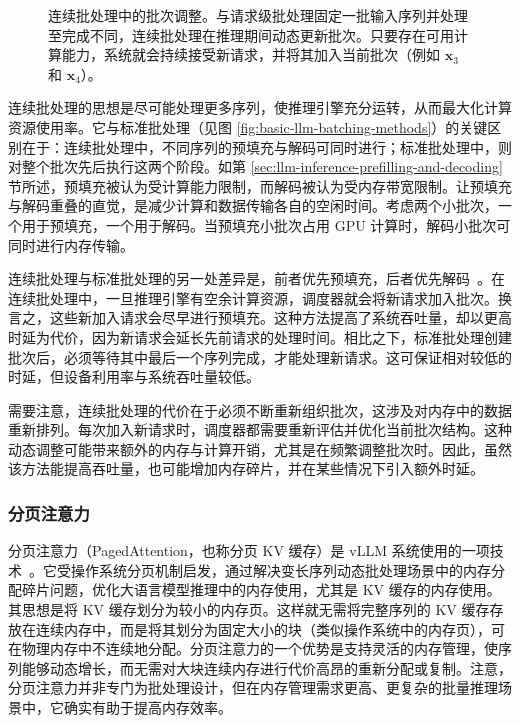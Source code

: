\begin{figure}[!t]
\centering

\vspace{-0.5cm} \caption{连续批处理中的批次调整。与请求级批处理固定一批输入序列并处理至完成不同，连续批处理在推理期间动态更新批次。只要存在可用计算能力，系统就会持续接受新请求，并将其加入当前批次（例如 $\mathbf{x}_3$ 和 $\mathbf{x}_4$）。}
\label{fig:llm-continuous-batching}
\end{figure}

连续批处理的思想是尽可能处理更多序列，使推理引擎充分运转，从而最大化计算资源使用率。它与标准批处理（见图 \ref{fig:basic-llm-batching-methods}）的关键区别在于：连续批处理中，不同序列的预填充与解码可同时进行；标准批处理中，则对整个批次先后执行这两个阶段。如第 \ref{sec:llm-inference-prefilling-and-decoding} 节所述，预填充被认为受计算能力限制，而解码被认为受内存带宽限制。让预填充与解码重叠的直觉，是减少计算和数据传输各自的空闲时间。考虑两个小批次，一个用于预填充，一个用于解码。当预填充小批次占用 GPU 计算时，解码小批次可同时进行内存传输。

连续批处理与标准批处理的另一处差异是，前者优先预填充，后者优先解码~\cite{agrawal-etal:2024taming}。在连续批处理中，一旦推理引擎有空余计算资源，调度器就会将新请求加入批次。换言之，这些新加入请求会尽早进行预填充。这种方法提高了系统吞吐量，却以更高时延为代价，因为新请求会延长先前请求的处理时间。相比之下，标准批处理创建批次后，必须等待其中最后一个序列完成，才能处理新请求。这可保证相对较低的时延，但设备利用率与系统吞吐量较低。

需要注意，连续批处理的代价在于必须不断重新组织批次，这涉及对内存中的数据重新排列。每次加入新请求时，调度器都需要重新评估并优化当前批次结构。这种动态调整可能带来额外的内存与计算开销，尤其是在频繁调整批次时。因此，虽然该方法能提高吞吐量，也可能增加内存碎片，并在某些情况下引入额外时延。

\subsubsection{分页注意力}


分页注意力（PagedAttention，也称分页 KV 缓存）是 vLLM 系统使用的一项技术~\cite{kwon-etal:2023efficient}。它受操作系统分页机制启发，通过解决变长序列动态批处理场景中的内存分配碎片问题，优化大语言模型推理中的内存使用，尤其是 KV 缓存的内存使用。其思想是将 KV 缓存划分为较小的内存页。这样就无需将完整序列的 KV 缓存存放在连续内存中，而是将其划分为固定大小的块（类似操作系统中的内存页），可在物理内存中不连续地分配。分页注意力的一个优势是支持灵活的内存管理，使序列能够动态增长，而无需对大块连续内存进行代价高昂的重新分配或复制。注意，分页注意力并非专门为批处理设计，但在内存管理需求更高、更复杂的批量推理场景中，它确实有助于提高内存效率。

